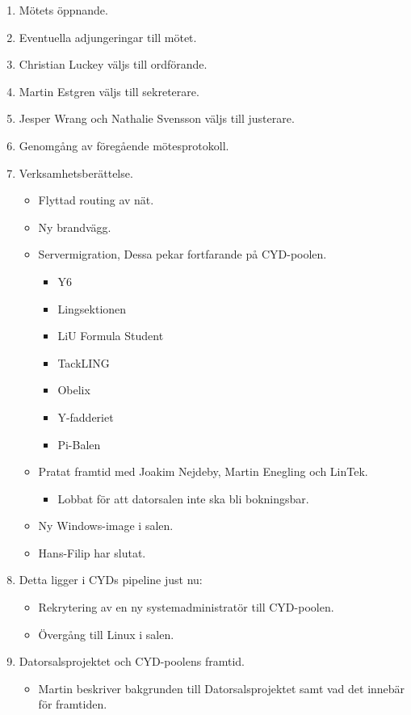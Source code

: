 \documentclass[a4paper,12pt]{article}
\begin{document}
\begin{enumerate}
\item Mötets öppnande.
\item Eventuella adjungeringar till mötet.
\item Christian Luckey väljs till ordförande.
\item Martin Estgren väljs till sekreterare.
\item Jesper Wrang och Nathalie Svensson väljs till justerare.
\item Genomgång av föregående mötesprotokoll.
\item Verksamhetsberättelse.
	\begin{itemize}
	\item Flyttad routing av nät.
	\item Ny brandvägg.
	\item Servermigration, Dessa pekar fortfarande på CYD-poolen.
		\begin{itemize}
		\item Y6
		\item Lingsektionen
		\item LiU Formula Student
		\item TackLING
		\item Obelix
		\item Y-fadderiet
		\item Pi-Balen
		\end{itemize}
	\item Pratat framtid med Joakim Nejdeby, Martin Enegling och LinTek.
		\begin{itemize}
		\item Lobbat för att datorsalen inte ska bli bokningsbar.
		\end{itemize}
	\item Ny Windows-image i salen.
	\item Hans-Filip har slutat.
	\end{itemize}
\item Detta ligger i CYDs pipeline just nu:
	\begin{itemize}
	\item Rekrytering av en ny systemadministratör till CYD-poolen.
	\item Övergång till Linux i salen.
	\end{itemize}
\item Datorsalsprojektet och CYD-poolens framtid.
	\begin{itemize}
		\item Martin beskriver bakgrunden till Datorsalsprojektet samt vad det innebär för framtiden.

\end{itemize}
\end{enumerate}
\end{document}
